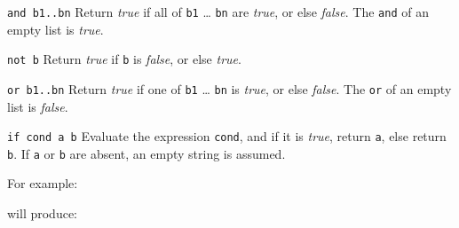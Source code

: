 \begin{desctab}
\item[\texttt{and b1..bn}\index{and@\texttt{and}}]
Return \textit{true} if all of \texttt{b1} {\ldots} \texttt{bn} are \textit{true},
or else \textit{false}.
The \texttt{and} of an empty list is \textit{true}.

\item[\texttt{not b}\index{not@\texttt{not}}]
Return \textit{true} if \texttt{b} is \textit{false}, or else \textit{true}.

\item[\texttt{or b1..bn}\index{or@\texttt{or}}]
Return \textit{true} if one of \texttt{b1}
{\ldots} \texttt{bn} is \textit{true},
or else \textit{false}.
The \texttt{or} of an empty list is \textit{false}.

\item[\texttt{if cond a b}]
Evaluate the expression \texttt{cond}, and if it is \textit{true}, return
\texttt{a}, else return \texttt{b}.
If \texttt{a} or \texttt{b} are absent, an empty string is assumed.
\end{desctab}
For example:
\begin{showfile}

\end{showfile}
will produce:
\begin{showfile}

\end{showfile}

